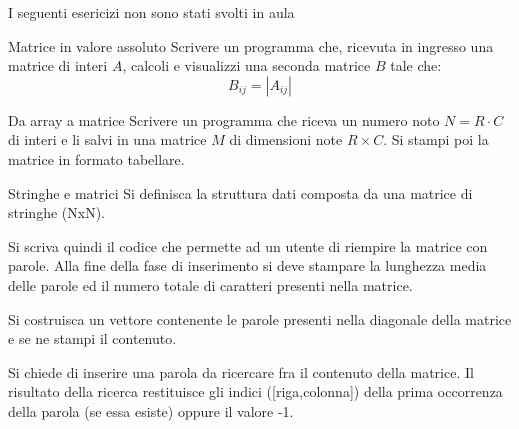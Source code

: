 \documentclass[aspectratio=169, handout]{beamer}
\begin{document}
\begin{frame}
    \alert{I seguenti esericizi non sono stati svolti in aula}
\end{frame}

\begin{frame}{Matrice in valore assoluto}
Scrivere un programma che, ricevuta in ingresso una matrice di interi $A$, calcoli e visualizzi una seconda matrice $B$ tale che:
\[ B_{ij} = |A_{ij}| \]
\end{frame}


\begin{frame}{Da array a matrice}
Scrivere un programma che riceva un numero noto $N=R\cdot C$ di interi e li salvi in una matrice $M$ di dimensioni note $R \times C$. Si stampi poi la matrice in formato tabellare.
\end{frame}


%

\begin{frame}{Stringhe e matrici}
Si definisca la struttura dati composta da una matrice di stringhe (NxN).

Si scriva quindi il codice che permette ad un utente di riempire la matrice con parole.
Alla fine della fase di inserimento si deve stampare la lunghezza media delle parole ed il numero
totale di caratteri presenti nella matrice.

Si costruisca un vettore contenente le parole presenti nella diagonale della matrice e se ne stampi
il contenuto.

Si chiede di inserire una parola da ricercare fra il contenuto della matrice. Il risultato della ricerca restituisce gli indici ([riga,colonna]) della prima occorrenza della parola (se essa esiste) oppure il valore -1.
\end{frame}
\end{document}
